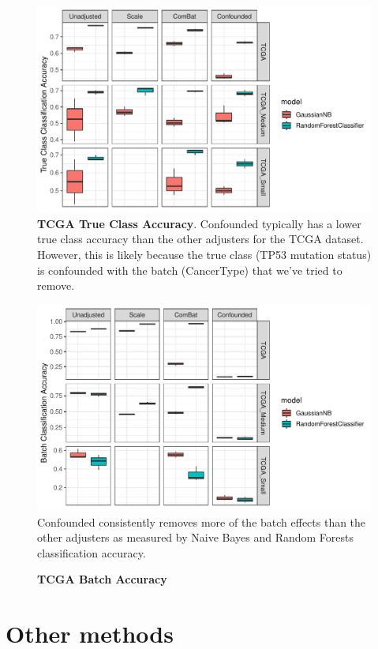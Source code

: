 \documentclass{article}
\begin{document}
\begin{figure}
	\centering
	\includegraphics[width=\columnwidth]{figures/supplement/tcga_true_class_accuracy.pdf}
	\caption{\textbf{TCGA True Class Accuracy}.
	Confounded typically has a lower true class accuracy than the other adjusters for the TCGA dataset.
	However, this is likely because the true class (TP53 mutation status) is confounded with the batch (CancerType) that we've tried to remove.
	\disclaimer{}
	}
	\label{fig:true_class}
\end{figure}
\begin{figure}
	\centering
	\includegraphics[width=\columnwidth]{figures/supplement/tcga_batch_accuracy.pdf}
	Confounded consistently removes more of the batch effects than the other adjusters as measured by Naive Bayes and Random Forests classification accuracy.
	\caption{\textbf{TCGA Batch Accuracy}
	\disclaimer{}
	}
	\label{fig:batch}
\end{figure}

\section{Other methods}
\end{document}
